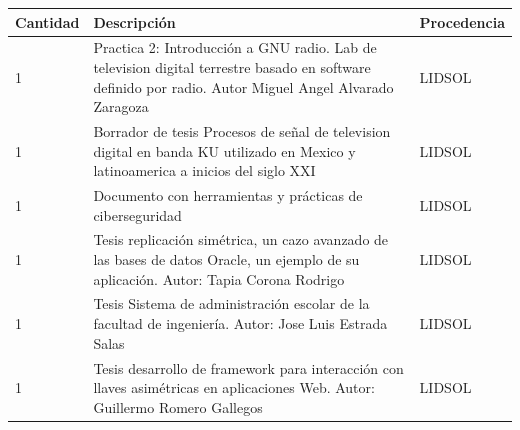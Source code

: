 \documentclass[a4paper,11pt]{article}                 %
\begin{document}
\begin{longtable}{|p{}|p{}|p{}|}
\newpage
\hline
Cantidad & Descripción                                                                                                                                               & Procedencia \\ \hline
1        & Practica 2: Introducción a GNU radio. Lab de television digital terrestre basado en software definido por radio. Autor Miguel Angel Alvarado Zaragoza  & LIDSOL      \\ \hline
1        & Borrador de tesis Procesos de señal de television digital en banda KU utilizado en Mexico y latinoamerica a inicios del siglo XXI                      & LIDSOL      \\ \hline
1        & Documento con herramientas y prácticas de ciberseguridad                                                                                               & LIDSOL      \\ \hline
1        & Tesis replicación simétrica, un cazo avanzado de las bases de datos Oracle, un ejemplo de su aplicación. Autor: Tapia Corona Rodrigo                   & LIDSOL      \\ \hline

1        & Tesis Sistema de administración escolar de la facultad de ingeniería. Autor: Jose Luis Estrada Salas                                                   & LIDSOL      \\ \hline
1        & Tesis desarrollo de framework para interacción con llaves asimétricas en aplicaciones Web. Autor: Guillermo Romero Gallegos                            & LIDSOL      \\ \hline

\end{longtable}


    
\end{document}
